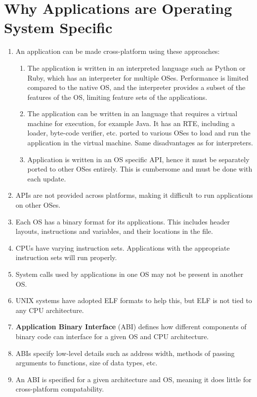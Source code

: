 \documentclass[journal,12pt,twocolumn]{IEEEtran}
\begin{document}
\section{Why Applications are Operating System Specific}
\begin{enumerate}
    \item An application can be made cross-platform using these approaches:
    \begin{enumerate}
        \item The application is written in an interpreted language such as 
        Python or Ruby, which has an interpreter for multiple OSes. 
        Performance is limited compared to the native OS, and the interpreter 
        provides a subset of the features of the OS, limiting feature sets of 
        the applications. 
        \item The application can be written in an language that requires a
        virtual machine for execution, for example Java. It has an RTE, 
        including a loader, byte-code verifier, etc. ported to various OSes 
        to load and run the application in the virtual machine. Same 
        disadvantages as for interpreters.
        \item Application is written in an OS specific API, hence it must be 
        separately ported to other OSes entirely. This is cumbersome and must 
        be done with each update. 
    \end{enumerate}
    \item APIs are not provided across platforms, making it difficult to run 
    applications on other OSes.
    \item Each OS has a binary format for its applications. This includes 
    header layouts, instructions and variables, and their locations in the file.
    \item CPUs have varying instruction sets. Applications with the appropriate
    instruction sets will run properly.
    \item System calls used by applications in one OS may not be present in 
    another OS.
    \item UNIX systems have adopted ELF formats to help this, but ELF is not 
    tied to any CPU architecture.
    \item \textbf{Application Binary Interface} (ABI) defines how different 
    components of binary code can interface for a given OS and CPU architecture.
    \item ABIs specify low-level details such as address width, methods of passing
    arguments to functions, size of data types, etc.
    \item An ABI is specified for a given architecture and OS, meaning it does
    little for cross-platform compatability.
\end{enumerate}
\end{document}
